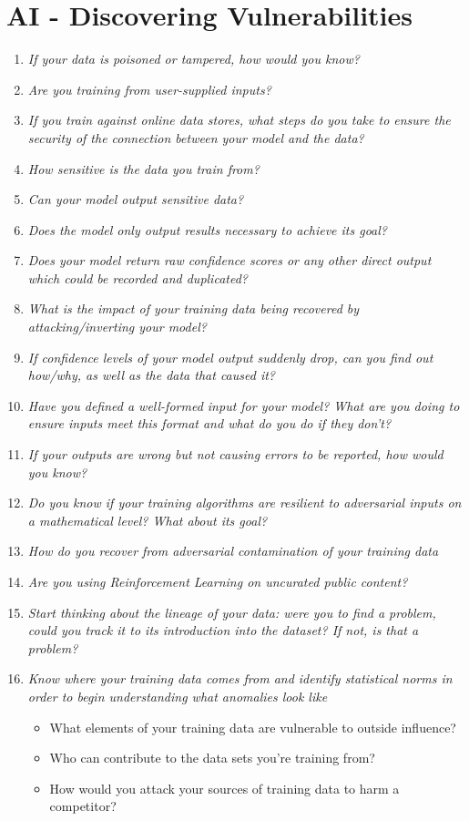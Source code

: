 \chapter{AI - Discovering Vulnerabilities}
\begin{enumerate}
   \footnotesize
   \item \textit{If your data is poisoned or tampered, how would you know?}
   \item \textit{Are you training from user-supplied inputs?}
   \item \textit{If you train against online data stores, what steps do you take to ensure the security of the connection between your model and the data?}
   \item \textit{How sensitive is the data you train from?}
   \item \textit{Can your model output sensitive data?}
   \item \textit{Does the model only output results necessary to achieve its goal?}
   \item \textit{Does your model return raw confidence scores or any other direct output which could be
   recorded and duplicated?}
   \item \textit{What is the impact of your training data being recovered by attacking/inverting your
   model?}
   \item \textit{If confidence levels of your model output suddenly drop, can you find out how/why, as well as the data that caused it?}
   \item \textit{Have you defined a well-formed input for your model? What are you doing to ensure inputs meet this format and what do you do if they don’t?}
   \item \textit{If your outputs are wrong but not causing errors to be reported, how would you know?}
   \item \textit{Do you know if your training algorithms are resilient to adversarial inputs on a mathematical level? What about its goal?}
   \item \textit{How do you recover from adversarial contamination of your training data}
   \item \textit{Are you using Reinforcement Learning on uncurated public content?}
   \item \textit{Start thinking about the lineage of your data: were you to find a problem, could you track it to its introduction into the dataset? If not, is that a problem?}
   \item \textit{Know where your training data comes from and identify statistical norms in order to begin understanding what anomalies look like}
   \begin{itemize}
      \item What elements of your training data are vulnerable to outside
      influence?
      \item Who can contribute to the data sets you’re training from?
      \item How would you attack your sources of training data to harm a
      competitor?
   \end{itemize}
\end{enumerate}


